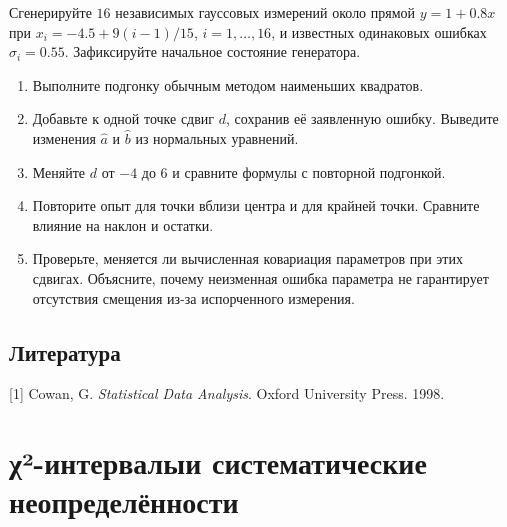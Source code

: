 \documentclass[
  russian,
  11pt,
  a4paper,
  open=any]{scrbook}
\newlength{\cslhangindent}
\newenvironment{CSLReferences}[2] %
 {\begin{list}{}{%
  \setlength{\itemindent}{0pt}
  \setlength{\leftmargin}{0pt}
  \setlength{\parsep}{0pt}
  \ifodd #1
   \setlength{\leftmargin}{\cslhangindent}
   \setlength{\itemindent}{-1\cslhangindent}
  \fi
  \setlength{\itemsep}{#2\baselineskip}}}
 {\end{list}}
\providecommand{\tightlist}{%
  \setlength{\itemsep}{0pt}\setlength{\parskip}{0pt}}
\DeclareRobustCommand{\BookTitleBreak}{\space}
\begin{document}
\begin{semanticpdfbox}[colback=BookCoralSoft,borderline west={1.2mm}{0pt}{BookCoral}]

\par\nopagebreak[4]\vspace{1.2mm}

Сгенерируйте \(16\) независимых гауссовых измерений около прямой
\(y=1+0.8x\) при \(x_i=-4.5+9(i-1)/15\), \(i=1,\ldots,16\), и известных
одинаковых ошибках \(\sigma_i=0.55\). Зафиксируйте начальное состояние
генератора.

\begin{enumerate}
\def\labelenumi{\arabic{enumi}.}
\tightlist
\item
  Выполните подгонку обычным методом наименьших квадратов.
\item
  Добавьте к одной точке сдвиг \(d\), сохранив её заявленную ошибку.
  Выведите изменения \(\widehat a\) и \(\widehat b\) из нормальных
  уравнений.
\item
  Меняйте \(d\) от \(-4\) до \(6\) и сравните формулы с повторной
  подгонкой.
\item
  Повторите опыт для точки вблизи центра и для крайней точки. Сравните
  влияние на наклон и остатки.
\item
  Проверьте, меняется ли вычисленная ковариация параметров при этих
  сдвигах. Объясните, почему неизменная ошибка параметра не гарантирует
  отсутствия смещения из-за испорченного измерения.
\end{enumerate}

\end{semanticpdfbox}

\section*{Литература}\label{ux43bux438ux442ux435ux440ux430ux442ux443ux440ux430-10}


\protect{}\label{refs}
\begin{CSLReferences}{0}{0}
{[}1{]} Cowan, G. \emph{Statistical Data Analysis}. Oxford University
Press. 1998.

\end{CSLReferences}

\chapter{\texorpdfstring{\texorpdfstring{χ²-интервалы\BookTitleBreak{}и систематические неопределённости}{χ²-интервалы и систематические неопределённости}}{χ²-интервалы и систематические неопределённости}}\label{ux3c7uxb2-ux438ux43dux442ux435ux440ux432ux430ux43bux44b-ux438-ux441ux438ux441ux442ux435ux43cux430ux442ux438ux447ux435ux441ux43aux438ux435-ux43dux435ux43eux43fux440ux435ux434ux435ux43bux451ux43dux43dux43eux441ux442ux438}
\end{document}
